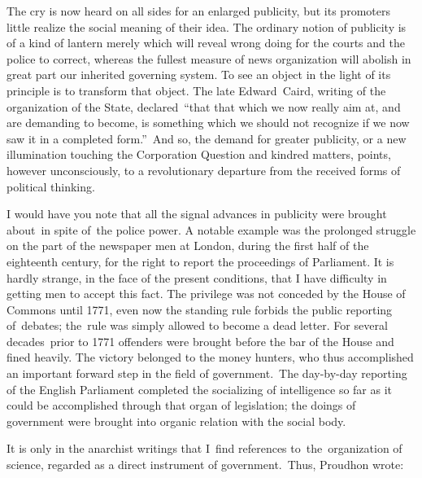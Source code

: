 \documentclass[openany,nobib]{tufte-book}
\begin{document}
The cry is now heard on all sides for an enlarged publicity, but its
promoters little realize the social meaning of their idea. The ordinary
notion of publicity is of a kind of lantern merely which will reveal
wrong doing for the courts and the police to correct, whereas the
fullest measure of news organization will abolish in great part our
inherited governing system. To see an object in the light of its
principle is to transform that object. The late Edward~Caird, writing of
the organization of the State, declared~``that that which we now really
aim at, and are demanding to become, is something which we should not
recognize if we now saw it in a completed form.''~And so, the demand for
greater publicity, or a new illumination touching the Corporation
Question and kindred matters, points, however unconsciously, to a
revolutionary departure from the received forms of political thinking.~

I would have you note that all the signal advances in publicity were
brought about~in spite of~the police power. A notable example was the
prolonged struggle on the part of the newspaper men at London, during
the first half of the eighteenth century, for the right to report the
proceedings of Parliament. It is hardly strange, in the face of the
present conditions, that I have difficulty in getting men to accept this
fact. The privilege was not conceded by the House of Commons until 1771,
even now the standing rule forbids the public reporting of~debates;
the~rule was simply allowed to become a dead letter. For several
decades~prior to 1771 offenders were brought before the bar of the House
and fined heavily. The victory belonged to the money hunters, who thus
accomplished an important forward step in the field of government.~The
day-by-day reporting of the English Parliament completed the socializing
of intelligence so far as it could be accomplished through that organ of
legislation; the doings of government were brought into organic relation
with the social body.~

It is only in the anarchist writings that I~find references
to~the~organization of science, regarded as a direct instrument of
government.~Thus, Proudhon wrote:~
\end{document}
